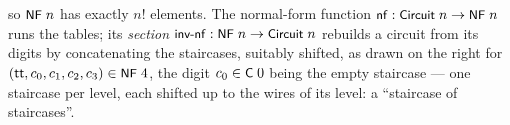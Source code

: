 \begin{center}
\begin{minipage}[c]{0.56\linewidth}
\begingroup\setlength{\mathindent}{0pt}
\begin{code}%
\>[0]\AgdaSpace{}%
\AgdaSymbol{:}\AgdaSpace{}%
\AgdaSpace{}%
\AgdaSpace{}%
\<%
\\
\>[0]\AgdaSpace{}%
%
\>[11]\AgdaSymbol{=}\AgdaSpace{}%
\<%
\\
\>[0]\AgdaSpace{}%
\AgdaSymbol{(}\AgdaSpace{}%
\AgdaSymbol{)}\AgdaSpace{}%
\AgdaSymbol{=}\AgdaSpace{}%
\AgdaSpace{}%
\AgdaSpace{}%
\AgdaSpace{}%
\AgdaSpace{}%
%
\>[26]\<%
\end{code}
\endgroup
\end{minipage}\hspace{2.5em}%
\begin{minipage}[c]{0.16\linewidth}\centering
\end{minipage}
\end{center}

\noindent so $\mbox{\textsf{\small NF}}\;n$ has exactly $n!$ elements.  The normal-form
function $\mbox{\textsf{\small nf}} : \mbox{\textsf{\small Circuit}}\;n \to \mbox{\textsf{\small NF}}\;n$ runs the tables;
its \emph{section} $\mbox{\textsf{\small inv-nf}} : \mbox{\textsf{\small NF}}\;n \to \mbox{\textsf{\small Circuit}}\;n$
rebuilds a circuit from its digits by concatenating the staircases,
suitably shifted, as drawn on the right for $(\mathsf{tt}, c_0, c_1,
c_2, c_3) \in \mbox{\textsf{\small NF}}\;4$, the digit $c_0 \in \mbox{\textsf{\small C}}\;0$ being the
empty staircase --- one staircase per level, each shifted up to the
wires of its level: a ``staircase of staircases''.

\fi

